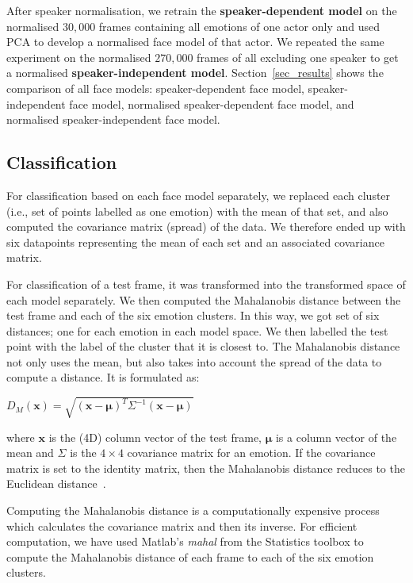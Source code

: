\documentclass[10pt,journal,cspaper,compsoc]{IEEEtran}
\begin{document}

After speaker normalisation, we retrain the \textbf{speaker-dependent model} on the normalised  $30,000$ frames containing all emotions of one actor only and used PCA to develop a normalised face model of that actor. We repeated the same experiment on the normalised $270,000$ frames of all excluding one speaker to get a normalised \textbf{speaker-independent model}. Section~\ref{sec_results} shows the comparison of all face models: speaker-dependent face model, speaker-independent face model, normalised speaker-dependent face model, and normalised speaker-independent face model.

\subsection{Classification}

For classification based on each face model separately, we replaced each cluster (i.e., set of points labelled as one emotion) with the mean of that set, and also computed the covariance matrix (spread) of the data. We therefore ended up with six datapoints representing the mean of each set and an associated covariance matrix. 

For classification of a test frame, it was transformed into the transformed space of each model separately. We then computed the Mahalanobis distance between the test frame and each of the six emotion clusters. In this way, we got set of six distances; one for each emotion in each model space.
We then labelled the test point with the label of the cluster that it is closest to. The Mahalanobis distance not only uses the mean, but also takes into account the spread of the data to compute a distance. It is formulated as:

\begin{center}
$ D_{M}(\mathbf{x}) =\sqrt{(\mathbf{x}-\mathbf{\mu})^{T}\Sigma^{-1}(\mathbf{x}-\mathbf{\mu})} $
\end{center}

\noindent where $\mathbf{x}$ is the (4D) column vector of the test frame, $\mathbf{\mu}$ is a column vector of the mean and $\Sigma$ is the $4 \times 4$ covariance matrix for an emotion. If the covariance matrix is set to the identity matrix, then the Mahalanobis distance reduces to the Euclidean distance~\cite{Mahal1936, Marsland09}.

Computing the Mahalanobis distance is a computationally expensive process which calculates the covariance matrix and then its inverse. For efficient computation, we have used Matlab's \textit{mahal} from the Statistics toolbox to compute the Mahalanobis distance of each frame to each of the six emotion clusters. 
\end{document}
